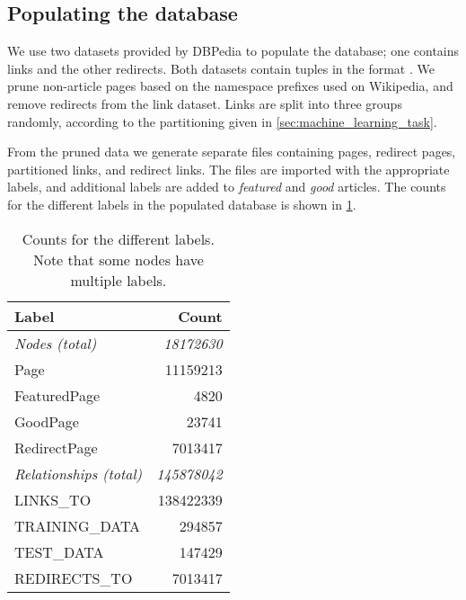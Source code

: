 \subsection{Populating the database}\label{sec:db_populate}
We use two datasets provided by DBPedia to populate the database; one contains links and the other redirects. Both datasets contain tuples in the format .  We prune non-article pages based on the namespace prefixes used on Wikipedia, and remove redirects from the link dataset. Links are split into three groups randomly, according to the partitioning given in \cref{sec:machine_learning_task}. 

From the pruned data we generate separate files containing pages, redirect pages, partitioned links, and redirect links. The files are imported with the appropriate labels, and additional labels are added to \emph{featured} and \emph{good} articles.
 The counts for the different labels in the populated database is shown in \cref{tab:db_counts}.

\begin{table}[tbp]
\centering
\begin{tabular}{@{}lr@{}}
\toprule
\textbf{Label}         & \textbf{Count}     \\ \midrule
\textit{Nodes (total)} & \textit{18172630}  \\
Page                   & 11159213           \\
FeaturedPage           & 4820               \\
GoodPage               & 23741              \\
RedirectPage           & 7013417            \\ \midrule
\textit{Relationships (total)} & \textit{145878042} \\
LINKS\_TO              & 138422339          \\
TRAINING\_DATA         & 294857             \\
TEST\_DATA             & 147429             \\
REDIRECTS\_TO          & 7013417            \\ \bottomrule
\end{tabular}
\caption[Counts for the different labels]{Counts for the different labels. Note that some nodes have multiple labels.}%
\label{tab:db_counts}
\end{table}
